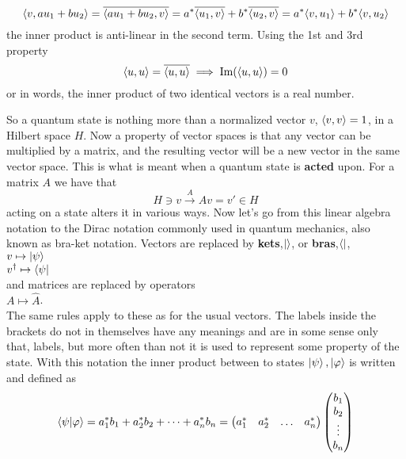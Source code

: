 \begin{equation}
\langle v,au_1 + bu_2 \rangle = \overline{\langle au_1 + bu_2,v \rangle} = a^{*}\overline{\langle u_1,v \rangle} + b^{*}\overline{\langle u_2,v \rangle} =   a^{*}\langle v,u_1 \rangle + b^{*}\langle v,u_2 \rangle
\end{equation} 
the inner product is anti-linear in the second term.
Using the 1st and 3rd property 
\begin{equation}
\langle u,u \rangle = \overline{\langle u,u \rangle} \implies \text{Im}(\langle u,u \rangle) = 0
\end{equation}
or in words, the inner product of two identical vectors is a real number.

So a quantum state is nothing more than a normalized vector $v$, $\langle v,v \rangle = 1$, in a Hilbert space $H$. Now a property of vector spaces is that any vector can be multiplied by a matrix, and the resulting vector will be a new vector in the same vector space. This is what is meant when a quantum state is \textbf{acted} upon. For a matrix $A$ we have that 
\begin{equation}
H \ni v  \xrightarrow{A} Av = v' \in H
\end{equation}
acting on a state alters it in various ways. Now let's go from this linear algebra notation to the Dirac notation commonly used in quantum mechanics, also known as bra-ket notation.
Vectors are replaced by \textbf{kets},$\ket{}$, or \textbf{bras},$\bra{}$, \\
$v \mapsto \ket{\psi}$ \\
$v^\dagger \mapsto \bra{\psi}$\\
and matrices are replaced by operators\\
$A \mapsto \hat{A}$.\\
The same rules apply to these as for the usual vectors.
The labels inside the brackets do not in themselves have any meanings and are in some sense only that, labels, but more often than not it is used to represent some property of the state. With this notation the inner product between to states $\ket{\psi},\ket{\varphi}$ is written and defined as
\begin{equation}
\bra{\psi}\ket{\varphi} = a_1^{*}b_1 + a_2^{*}b_2 + \dots + a_n^{*}b_n = \begin{pmatrix} a_1^{*} & a_2^{*} & \dots & a_n^{*}\end{pmatrix} \begin{pmatrix} b_1 \\ b_2 \\ \vdots \\ b_n\end{pmatrix}
\end{equation}
